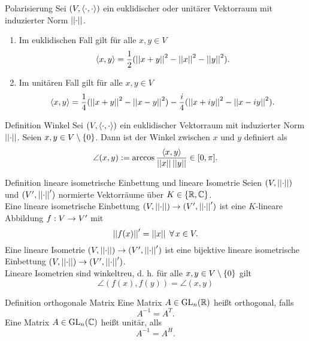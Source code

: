 \documentclass[main.tex]{subfiles}
\begin{document}
\begin{karte}{Polarisierung}
    Sei \((V, \langle \cdot, \cdot \rangle)\) ein euklidischer oder unitärer Vektorraum mit induzierter
    Norm \(\left|\left|\cdot\right|\right|\).
    \begin{enumerate}
        \item Im euklidischen Fall gilt für alle \(x, y \in V\)
        \[ \langle x, y \rangle = \frac{1}{2}(\left|\left|x+y\right|\right|^2-\left|\left|x\right|\right|^2-\left|\left|y\right|\right|^2). \]
        \item Im unitären Fall gilt für alle \(x, y \in V\)
        \[ \langle x, y \rangle = \frac{1}{4}(\left|\left|x+y\right|\right|^2-\left|\left|x-y\right|\right|^2) 
        - \frac{i}{4}(\left|\left|x+iy\right|\right|^2-\left|\left|x-iy\right|\right|^2). \]
    \end{enumerate}
\end{karte}

\begin{karte}{Definition Winkel}
    Sei \((V, \langle \cdot, \cdot \rangle)\) ein euklidischer Vektorraum mit induzierter Norm \(\left|\left|\cdot\right|\right|\).
    Seien \(x, y \in V \setminus \{0\}\). Dann ist der Winkel zwischen \(x\) und \(y\) definiert als
    \[ \angle (x,y) := \arccos \frac{\langle x, y \rangle}{\left|\left|x\right|\right| \left|\left|y\right|\right|} \in [0, \pi]. \]
\end{karte}

\begin{karte}{Definition lineare isometrische Einbettung und lineare Isometrie}
    Seien \((V, \left|\left|\cdot\right|\right|)\) und \((V', \left|\left|\cdot\right|\right|')\) normierte Vektorräume über 
    \(K \in \{\mathbb{R}, \mathbb{C}\}\).\\
    Eine lineare isometrische Einbettung \((V, \left|\left|\cdot\right|\right|) \rightarrow (V', \left|\left|\cdot\right|\right|')\)
    ist eine \(K\)-lineare Abbildung \(f : V \rightarrow V'\) mit
    \[ \norm{f(x)}' = \norm{x} \; \forall x \in V. \]
    Eine lineare Isometrie \((V, \left|\left|\cdot\right|\right|) \rightarrow (V', \left|\left|\cdot\right|\right|')\) ist eine
    bijektive lineare isometrische Einbettung \((V, \left|\left|\cdot\right|\right|) \rightarrow (V', \left|\left|\cdot\right|\right|')\).\\
    Lineare Isometrien sind winkeltreu, d. h. für alle \(x, y \in V \setminus \{0\}\) gilt
    \[ \angle (f(x), f(y)) = \angle (x,y) \]
\end{karte}

\begin{karte}{Definition orthogonale Matrix}
    Eine Matrix \(A \in \operatorname{GL}_n(\mathbb{R})\) heißt orthogonal, falls
    \[ A^{-1} = A^T. \]
    Eine Matrix \(A \in \operatorname{GL}_n(\mathbb{C})\) heißt unitär, alls
    \[A^{-1} = A^H.\]
\end{karte}
\end{document}
